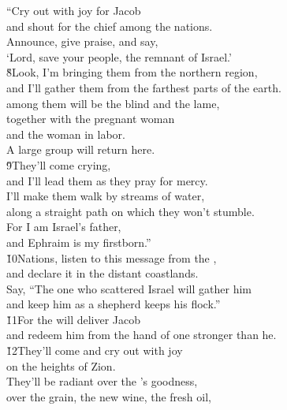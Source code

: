 \begin{poetry}
\poeml ``Cry out with joy for Jacob \\
\poemll    and shout for the chief among the nations. \\
\poeml Announce, give praise, and say, \\
\poemll    `Lord, save your people, the remnant of Israel.' \\
\poeml \v{8}Look, I'm bringing them from the northern region, \\
\poemll    and I'll gather them from the farthest parts of the earth. \\
\poeml among them will be the blind and the lame, \\
\poemll    together with the pregnant woman \\
\poemlll       and the woman in labor. \\
\poeml A large group will return here. \\
\poeml \v{9}They'll come crying, \\
\poemll    and I'll lead them as they pray for mercy. \\
\poeml I'll make them walk by streams of water, \\
\poemll    along a straight path on which they won't stumble. \\
\poeml For I am Israel's father, \\
\poemll    and Ephraim is my firstborn.'' \\
\poeml \v{10}Nations, listen to this message from the , \\
\poemll    and declare it in the distant coastlands. \\
\poeml Say, ``The one who scattered Israel will gather him \\
\poemll    and keep him as a shepherd keeps his flock.'' \\
\poeml \v{11}For the  will deliver Jacob \\
\poemll    and redeem him from the hand of one stronger than he. \\
\poeml \v{12}They'll come and cry out with joy \\
\poemll    on the heights of Zion. \\
\poeml They'll be radiant over the 's goodness, \\
\poemll    over the grain, the new wine, the fresh oil, \\

\end{poetry}
